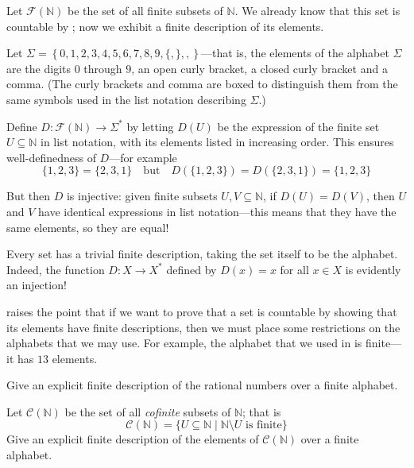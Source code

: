\begin{example}
\label{exFiniteDescriptionOfFiniteSubsetsOfN}
Let $\mathcal{F}(\mathbb{N})$ be the set of all finite subsets of $\mathbb{N}$. We already know that this set is countable by ; now we exhibit a finite description of its elements.

Let $\Sigma = \left\{ 0,1,2,3,4,5,6,7,8,9,\boxed{\{},\boxed{\}},\boxed{,} \right\}$---that is, the elements of the alphabet $\Sigma$ are the digits $0$ through $9$, an open curly bracket, a closed curly bracket and a comma. (The curly brackets and comma are boxed to distinguish them from the same symbols used in the list notation describing $\Sigma$.)

Define $D : \mathcal{F}(\mathbb{N}) \to \Sigma^*$ by letting $D(U)$ be the expression of the finite set $U \subseteq \mathbb{N}$ in list notation, with its elements listed in increasing order. This ensures well-definedness of $D$---for example
\[ \{1,2,3\} = \{2,3,1\} \quad \text{but} \quad D(\{1,2,3\}) = D(\{2,3,1\}) = \{1,2,3\} \] 

But then $D$ is injective: given finite subsets $U, V \subseteq \mathbb{N}$, if $D(U) = D(V)$, then $U$ and $V$ have identical expressions in list notation---this means that they have the same elements, so they are equal!
\end{example}

\begin{example}
\label{exTrivialFiniteDescription}
Every set has a trivial finite description, taking the set itself to be the alphabet. Indeed, the function $D : X \to X^*$ defined by $D(x) = x$ for all $x \in X$ is evidently an injection!
\end{example}

 raises the point that if we want to prove that a set is countable by showing that its elements have finite descriptions, then we must place some restrictions on the alphabets that we may use. For example, the alphabet that we used in  is finite---it has $13$ elements.

\begin{exercise}
\label{exFiniteDescriptionOfQ}
Give an explicit finite description of the rational numbers over a finite alphabet.
\end{exercise}

\begin{exercise}
\label{exFiniteDescriptionOfCofiniteSubsetsOfN}
Let $\mathcal{C}(\mathbb{N})$ be the set of all \textit{cofinite} subsets of $\mathbb{N}$; that is
\[ \mathcal{C}(\mathbb{N}) = \{ U \subseteq \mathbb{N} \mid \mathbb{N} \setminus U \text{ is finite} \} \]
Give an explicit finite description of the elements of $\mathcal{C}(\mathbb{N})$ over a finite alphabet.
\end{exercise}

